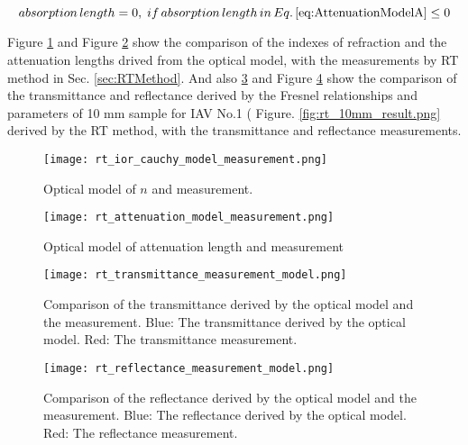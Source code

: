 \begin{equation}
\label{eq:AttenuationModelB}
absorption\,length = 0,\;if\,absorption\,length\,in\,Eq.\,\ref{eq:AttenuationModelA}\leq0
\end{equation}


Figure \ref{fig:rt_ior_cauchy_model_measurement.png} and Figure \ref{fig:rt_attenuation_model_measurement.png} show the comparison of the indexes of refraction and the attenuation lengths drived from the
optical model, with the measurements by RT method in Sec. \ref{sec:RTMethod}.
And also \ref{fig:rt_transmittance_measurement_model} and Figure \ref{fig:rt_reflectance_measurement_model} show the comparison of the transmittance
and reflectance derived by the Fresnel relationships and parameters
of 10 mm sample for IAV No.1 ( Figure. \ref{fig:rt_10mm_result.png}
derived by the RT method, with the transmittance and reflectance measurements.




\begin{figure}
    \centering
    \texttt{[image: rt\_ior\_cauchy\_model\_measurement.png]}
    \caption[Optical model of $n$ and measurement]{Optical model of $n$ and measurement.}
    \label{fig:rt_ior_cauchy_model_measurement.png}
    \end{figure}



\begin{figure}
    \centering
    \texttt{[image: rt\_attenuation\_model\_measurement.png]}
    \caption[Optical model of attenuation length and measurement]{Optical model of attenuation length and measurement}
    \label{fig:rt_attenuation_model_measurement.png}
    \end{figure}


\begin{figure}
    \centering
    \texttt{[image: rt\_transmittance\_measurement\_model.png]}
    \caption[Comparison of the transmittance derived by the optical model and the measurement]
{
Comparison of the transmittance derived by the optical model and the measurement.
Blue: The transmittance derived by the optical model.
Red: The transmittance measurement.
}
    \label{fig:rt_transmittance_measurement_model}
    \end{figure}


\begin{figure}
    \centering
    \texttt{[image: rt\_reflectance\_measurement\_model.png]}
    \caption[Comparison of the reflectance derived by the optical model and the measurement.]
{
Comparison of the reflectance derived by the optical model and the measurement.
Blue: The reflectance derived by the optical model.
Red: The reflectance measurement.
}
    \label{fig:rt_reflectance_measurement_model}
    \end{figure}



